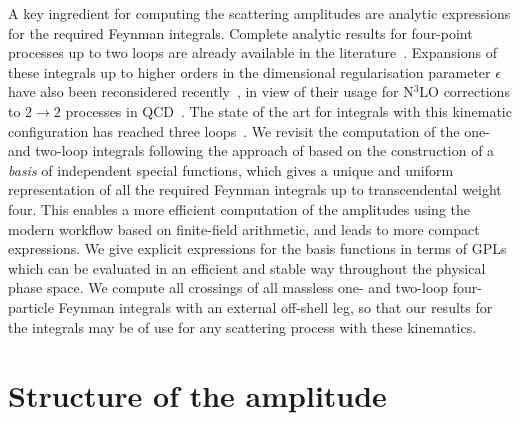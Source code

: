 \documentclass[main.tex]{subfiles}
\begin{document}
A key ingredient for computing the scattering amplitudes are analytic
expressions for the required Feynman integrals.  Complete analytic results for four-point processes up
to two loops are already available in the
literature~\cite{gehrmann:2000zt,gehrmann:2001ck,Gehrmann:2002zr}.  Expansions
of these integrals up to higher orders in the dimensional regularisation
parameter $\epsilon$ have also been reconsidered
recently~\cite{Gehrmann:2023etk}, in view of their usage for N$^3$LO
corrections to $2\to 2$ processes in
QCD~\cite{Gehrmann:2022vuk,Gehrmann:2023zpz}.  The state of the art for
integrals with this kinematic configuration has reached three
loops~\cite{DiVita:2014pza,Canko:2020gqp,Canko:2021xmn,Henn:2023vbd}.  We
revisit the computation of the one- and two-loop integrals following the
approach of
based on the construction of a \emph{basis} of independent special functions,
which gives a unique and uniform representation of all the required Feynman
integrals up to transcendental weight four.  This enables a more efficient
computation of the amplitudes using the modern workflow based on finite-field
arithmetic, and leads to more compact expressions. We give explicit expressions
for the basis functions in terms of GPLs which can be evaluated in an
efficient and stable way throughout the physical phase space.  We compute all
crossings of all massless one- and two-loop four-particle Feynman integrals
with an external off-shell leg, so that our results for the integrals may be of
use for any scattering process with these kinematics.


\section{Structure of the amplitude}
\label{secQED:structure}
\end{document}
